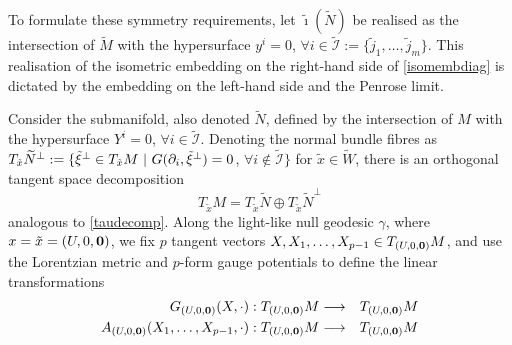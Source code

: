 To formulate these symmetry requirements, let
$\widetilde{\imath}(\widetilde{N})$ be realised as the intersection of
$\widetilde{M}$ with the hypersurface $y^i=0$, $\forall i\in\widetilde{\mathcal
  I}:=\{\tilde j_1,\dots,\tilde j_m\}$. This realisation of the isometric
embedding on the right-hand side of \eqref{isomembdiag} is dictated by the
embedding on the left-hand side and the Penrose limit.

Consider the submanifold, also denoted $\widetilde{N}$, defined by the
intersection of $M$ with the hypersurface $Y^i=0$, $\forall
i\in\widetilde{\mathcal I}$. Denoting the normal bundle fibres as $T_{\tilde
  x}\widetilde{N}^{\perp}:=\{\tilde\xi^\perp\in T_{\tilde
  x}M~|~G(\partial_i,\tilde\xi^\perp)=0$, $\forall i\notin\widetilde{\mathcal I}\}$
for $\tilde x\in\widetilde{W}$, there is an orthogonal tangent space
decomposition
\begin{equation}
  \label{tautildedecomp}
  T_{\tilde x}M=T_{\tilde x}\widetilde{N}\oplus T_{\tilde x}
  \widetilde{N}^{\perp}
\end{equation}
analogous to \eqref{taudecomp}. Along the light-like null geodesic $\gamma$,
where $x=\tilde x=(U,0,{\boldsymbol {0} })$, we fix $p$ tangent vectors
$X,X_1,\dots,X_{p-1}\in T_{(U,0,{\boldsymbol {0} })}M$, and use the Lorentzian metric and
$p$-form gauge potentials to define the linear transformations
\begin{eqnarray}
  \label{Gelinmap}
  G_{(U,0,{\boldsymbol {0} })}(X,\cdot):T_{(U,0,{\boldsymbol {0} })}M&\longrightarrow&
  T_{(U,0,{\boldsymbol {0} })}M \\
  \label{Aelinmap}
  A_{(U,0,{\boldsymbol {0} })}(X_1,\dots,X_{p-1},\cdot):T_{(U,0,{\boldsymbol {0} })}M&
  \longrightarrow&T_{(U,0,{\boldsymbol {0} })}M
\end{eqnarray}


